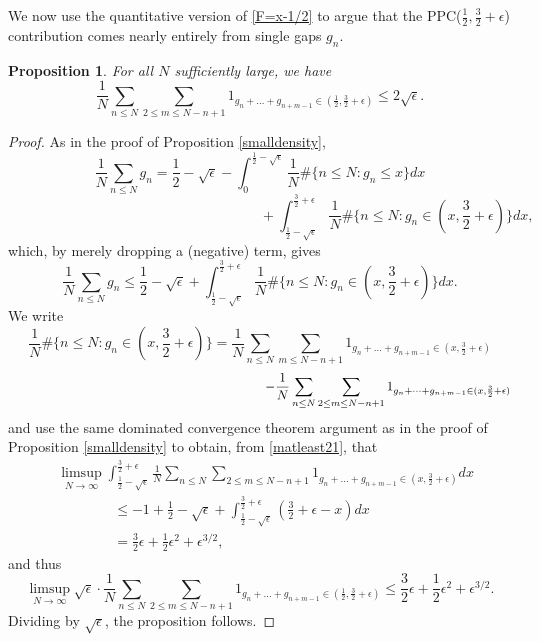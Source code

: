 \documentclass[12pt]{amsart}
\newtheorem{proposition}{Proposition}[section]
\theoremstyle{definition}
\newcommand{\vs}{\vspace{3mm}}
\newcommand{\ep}{\epsilon}
\begin{document}
\vs

We now use the quantitative version of \eqref{F=x-1/2} to argue that the PPC($\frac{1}{2},\frac{3}{2}+\ep$) contribution comes nearly entirely from single gaps $g_n$. 

\vspace{1.5mm}

\begin{proposition}\label{smallPPCmatleast2}
For all $N$ sufficiently large, we have
$$\frac{1}{N} \sum_{n \le N} \sum_{2 \le m \le N-n+1} 1_{g_n+\dots+g_{n+m-1} \in (\frac{1}{2},\frac{3}{2}+\epsilon)} \le 2\sqrt{\epsilon}.$$
\end{proposition}

\begin{proof}
As in the proof of Proposition \ref{smalldensity}, $$\frac{1}{N}\sum_{n \le N} g_n = \frac{1}{2}-\sqrt{\epsilon}-\int_0^{\frac{1}{2}-\sqrt{\epsilon}} \frac{1}{N}\#\{n \le N : g_n \le x\}dx $$ $$\qquad \qquad \qquad \qquad \qquad \qquad \qquad\qquad \qquad +  \int_{\frac{1}{2}-\sqrt{\epsilon}}^{\frac{3}{2}+\epsilon} \frac{1}{N}\#\{n \le N : g_n \in (x,\frac{3}{2}+\epsilon)\}dx,$$ which, by merely dropping a (negative) term, gives \begin{equation}\label{matleast21}\frac{1}{N}\sum_{n \le N} g_n \le \frac{1}{2}-\sqrt{\epsilon}+\int_{\frac{1}{2}-\sqrt{\epsilon}}^{\frac{3}{2}+\epsilon} \frac{1}{N}\#\{n \le N : g_n \in (x,\frac{3}{2}+\epsilon)\}dx.\end{equation} We write $$\frac{1}{N}\#\{n \le N : g_n \in (x,\frac{3}{2}+\ep)\} = \frac{1}{N}\sum_{n \le N}\sum_{m \le N-n+1} 1_{g_n+\dots+g_{n+m-1} \in (x,\frac{3}{2}+\ep)}$$ $$\hspace{70mm} -\frac{1}{N}\sum_{n \le N}\sum_{2 \le m \le N-n+1} 1_{g_n+\dots+g_{n+m-1} \in  (x,\frac{3}{2}+\ep)}$$ and use the same dominated convergence theorem argument as in the proof of Proposition \ref{smalldensity} to obtain, from \eqref{matleast21}, that \begin{align*} &\limsup_{N \to \infty} \int_{\frac{1}{2}-\sqrt{\epsilon}}^{\frac{3}{2}+\epsilon} \frac{1}{N}\sum_{n \leq N}\sum_{2 \le m \le N-n+1} 1_{g_n+\dots+g_{n+m-1} \in (x,\frac{3}{2}+\epsilon)}dx \\ &\qquad \qquad \le -1+\frac{1}{2}-\sqrt{\epsilon}+\int_{\frac{1}{2}-\sqrt{\epsilon}}^{\frac{3}{2}+\epsilon} (\frac{3}{2}+\epsilon-x)dx \\ &\qquad \qquad = \frac{3}{2}\epsilon+\frac{1}{2}\epsilon^2+\epsilon^{3/2},\end{align*} and thus $$\limsup_{N \to \infty} \sqrt{\epsilon}\cdot \frac{1}{N}\sum_{n \leq N}\sum_{2 \le m \le N-n+1} 1_{g_n+\dots+g_{n+m-1} \in (\frac{1}{2},\frac{3}{2}+\epsilon)} \le \frac{3}{2}\epsilon+\frac{1}{2}\epsilon^2+\epsilon^{3/2}.$$ Dividing by $\sqrt{\ep}$, the proposition follows.
\end{proof}
\end{document}

